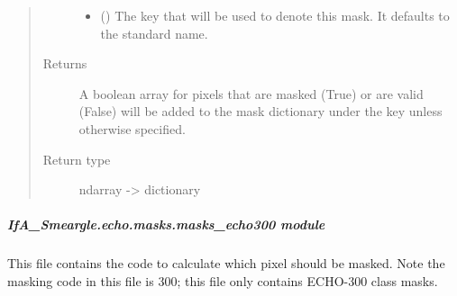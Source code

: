 \documentclass[letterpaper,10pt,english]{sphinxmanual}
\begin{document}
\begin{fulllineitems}
\begin{quote}
\begin{description}
\begin{itemize}
\item {} 
 (\sphinxstyleliteralemphasis{\sphinxupquote{ (}}\sphinxstyleliteralemphasis{\sphinxupquote{)}}) \textendash{} The key that will be used to denote this mask. It defaults to the
standard name.

\end{itemize}

\item[{Returns}] \leavevmode
{} \textendash{} A boolean array for pixels that are masked (True) or are valid (False)
will be added to the mask dictionary under the key
 unless otherwise specified.

\item[{Return type}] \leavevmode
ndarray -\textgreater{} dictionary

\end{description}\end{quote}

\end{fulllineitems}



\subparagraph{IfA\_Smeargle.echo.masks.masks\_echo300 module}
\label{\detokenize{python_docstrings/IfA_Smeargle.echo.masks.masks_echo300:module-IfA_Smeargle.echo.masks.masks_echo300}}\label{\detokenize{python_docstrings/IfA_Smeargle.echo.masks.masks_echo300:ifa-smeargle-echo-masks-masks-echo300-module}}\label{\detokenize{python_docstrings/IfA_Smeargle.echo.masks.masks_echo300::doc}}
This file contains the code to calculate which pixel should be masked. Note the masking code
in this file is 300; this file only contains ECHO-300 class masks.
\end{document}
